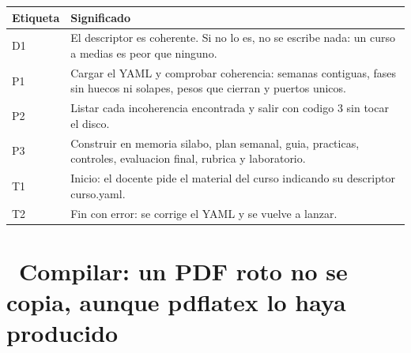 \documentclass[11pt,a4paper]{article}
\newcommand{\iconotexto}[2]{\textcolor{cyanNeon}{\faIcon{#1}}~#2}
\begin{document}
\vspace{6pt}
\begin{tcolorbox}[cajaContenido, title={\faIcon{table}~Leyenda de etiquetas}]
\small
\begin{tabularx}{\linewidth}{@{}>{\centering\arraybackslash}p{1.4cm}X@{}}
\toprule
\textbf{Etiqueta} & \textbf{Significado} \\ \midrule
D1 & El descriptor es coherente. Si no lo es, no se escribe nada: un curso a medias es peor que ninguno. \\
P1 & Cargar el YAML y comprobar coherencia: semanas contiguas, fases sin huecos ni solapes, pesos que cierran y puertos unicos. \\
P2 & Listar cada incoherencia encontrada y salir con codigo 3 sin tocar el disco. \\
P3 & Construir en memoria silabo, plan semanal, guia, practicas, controles, evaluacion final, rubrica y laboratorio. \\
T1 & Inicio: el docente pide el material del curso indicando su descriptor curso.yaml. \\
T2 & Fin con error: se corrige el YAML y se vuelve a lanzar. \\
\bottomrule
\end{tabularx}
\end{tcolorbox}

\section{\iconotexto{file-signature}{Compilar: un PDF roto no se copia, aunque pdflatex lo haya producido}}

\begin{center}
\end{center}
\end{document}
